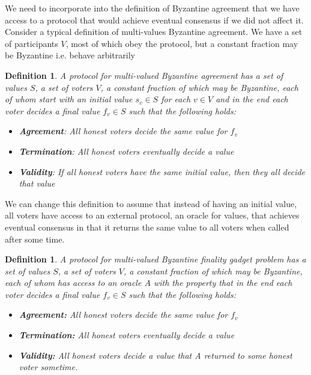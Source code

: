 \documentclass{article}
\newtheorem{definition}[theorem]{Definition}
\begin{document}
We need to incorporate into the definition of Byzantine agreement that we have access to a protocol that would achieve eventual consensus if we did not affect it. Consider a typical definition of multi-values Byzantine agreement.
We have a	set of participants $V$, most of which obey the protocol, but a constant fraction may be Byzantine i.e. behave arbitrarily

\begin{definition} A protocol for multi-valued Byzantine agreement has a set of values $S$, a set of voters $V$, a constant fraction of which may be Byzantine, each of whom start with an initial value $s_v \in S$ for each $v \in V$ and in the end each voter decides a final value $f_v \in S$ such that the following holds:

\begin{itemize}
\item {\bf Agreement}: All honest voters decide the same value for $f_v$
\item {\bf Termination}: All honest voters eventually decide a value
\item {\bf Validity}: If all honest voters have the same initial value, then they all decide that value
\end{itemize}

\end{definition}

We can change this definition to assume that instead of having an initial value, all voters have access to an external protocol, an oracle for values, that achieves eventual consensus in that it returns the same value to all voters when called after some time.

\begin{definition} A protocol for multi-valued Byzantine finality gadget problem has a set of values $S$, a set of voters $V$, a constant fraction of which may be Byzantine, each of whom has access to an oracle $A$ with the property that in the end each voter decides a final value $f_v \in S$ such that the following holds:


\begin{itemize}
\item {\bf Agreement:} All honest voters decide the same value for $f_v$
\item {\bf Termination:} All honest voters eventually decide a value
\item {\bf Validity:} All honest voters decide a value that A returned to some honest voter sometime.
\end{itemize}

\end{definition}
\end{document}
